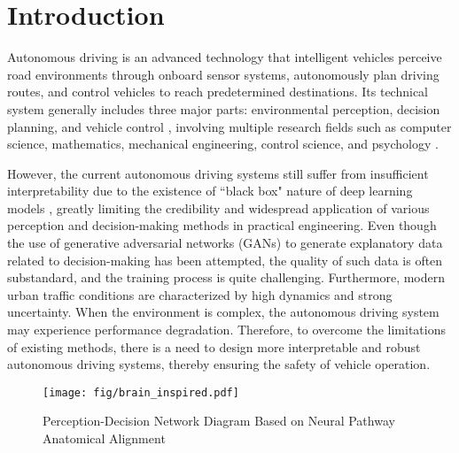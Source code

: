 \section{Introduction}
\label{sec:intro}
\hspace{1pc}Autonomous driving \cite{urmson2008autonomous} is an advanced technology that intelligent vehicles perceive road environments through onboard sensor systems, autonomously plan driving routes, and control vehicles to reach predetermined destinations. 
Its technical system generally includes three major parts: environmental perception, decision planning, and vehicle control \cite{amini2020learning, montemerlo2008junior}, involving multiple research fields such as computer science, mathematics, mechanical engineering, control science, and psychology \cite{chen2015deepdriving}.


However, the current autonomous driving systems still suffer from insufficient interpretability due to the existence of ``black box" nature of deep learning models \cite{7979332}, greatly limiting the credibility and widespread application of various perception and decision-making methods in practical engineering. 
Even though the use of generative adversarial networks (GANs) \cite{zugner2020adversarial} to generate explanatory data related to decision-making has been attempted, the quality of such data is often substandard, and the training process is quite challenging. 
Furthermore, modern urban traffic conditions are characterized by high dynamics and strong uncertainty. 
When the environment is complex, the autonomous driving system may experience performance degradation. 
Therefore, to overcome the limitations of existing methods, there is a need to design more interpretable and robust autonomous driving systems, thereby ensuring the safety of vehicle operation.
\begin{figure}[t]
	\centering
	\texttt{[image: fig/brain\_inspired.pdf]}
	\caption{Perception-Decision Network Diagram Based on Neural Pathway Anatomical Alignment}
	\label{fig:fig1}
\end{figure}

